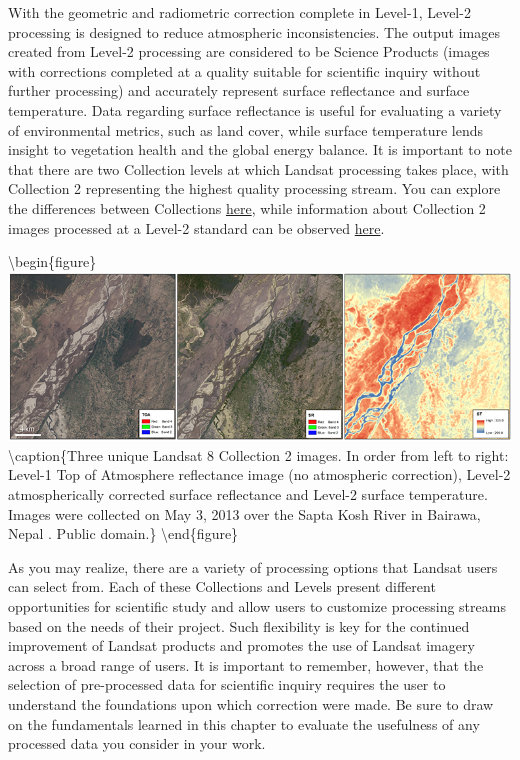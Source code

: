 \documentclass[
]{book}
\begin{document}
With the geometric and radiometric correction complete in Level-1,
Level-2 processing is designed to reduce atmospheric inconsistencies.
The output images created from Level-2 processing are considered to be
Science Products (images with corrections completed at a quality
suitable for scientific inquiry without further processing) and
accurately represent surface reflectance and surface temperature. Data
regarding surface reflectance is useful for evaluating a variety of
environmental metrics, such as land cover, while surface temperature
lends insight to vegetation health and the global energy balance. It is
important to note that there are two Collection levels at which Landsat
processing takes place, with Collection 2 representing the highest
quality processing stream. You can explore the differences between
Collections
\href{https://prd-wret.s3.us-west-2.amazonaws.com/assets/palladium/production/atoms/files/Landsat-C1vsC2-2021-0430-LMWS.pdf}{here},
while information about Collection 2 images processed at a Level-2
standard can be observed
\href{https://www.usgs.gov/core-science-systems/nli/landsat/landsat-collection-2-level-2-science-products}{here}.

\textbackslash begin\{figure\}
\includegraphics[width=0.9\linewidth]{images/13-landsat-c2-l2} \textbackslash caption\{Three unique Landsat 8 Collection 2 images. In order from left to right: Level-1 Top of Atmosphere reflectance image (no atmospheric correction), Level-2 atmospherically corrected surface reflectance and Level-2 surface temperature. Images were collected on May 3, 2013 over the Sapta Kosh River in Bairawa, Nepal \citep{bouchard_example_2013}. Public domain.\}\label{fig:13-landsat-c2-l2}
\textbackslash end\{figure\}

As you may realize, there are a variety of processing options that
Landsat users can select from. Each of these Collections and Levels
present different opportunities for scientific study and allow users to
customize processing streams based on the needs of their project. Such
flexibility is key for the continued improvement of Landsat products and
promotes the use of Landsat imagery across a broad range of users. It is
important to remember, however, that the selection of pre-processed data
for scientific inquiry requires the user to understand the foundations
upon which correction were made. Be sure to draw on the fundamentals
learned in this chapter to evaluate the usefulness of any processed data
you consider in your work.
\end{document}
